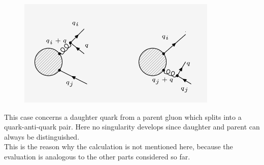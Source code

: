 
\begin{figure}[ht!]
\centering
\includegraphics[width=0.85\textwidth]{images/QG/QGDiagrams.png}
\end{figure}

This case concerns a daughter quark from a parent gluon which splits into a quark-anti-quark pair. Here no singularity develops since daughter and parent can always be distinguished.\\
This is the reason why the calculation is not mentioned here, because the evaluation is analogous to the other parts considered so far.
\pagebreak
%
%
%
%
%
%
